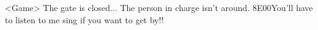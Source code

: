 <Game> The gate is closed... 
The person in charge isn't around. 
{8E}{00}You'll have to listen to me sing if you want to get by!! 
